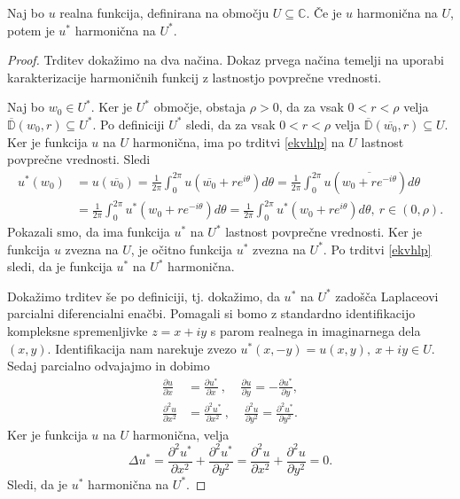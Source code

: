 \documentclass[mat1, tisk]{fmfdelo}
\begin{document}
    \begin{lema}
        \label{lemaharm}
        Naj bo $u$ realna funkcija, definirana na območju $U \subseteq \mathbb{C}$. Če je $u$ harmonična na $U$, potem je $u^*$ harmonična na $U^*$. 
    \end{lema}
    \begin{proof}
        Trditev dokažimo na dva načina. Dokaz prvega načina temelji na uporabi karakterizacije harmoničnih funkcij z lastnostjo povprečne vrednosti. 
        
        Naj bo \mbox{$w_0 \in U^*$}. Ker je $U^*$ območje, obstaja $\rho>0$, da za vsak $0 < r < \rho$ velja $\overline{\mathbb{D}}(w_0, r) \subseteq U^*$. Po definiciji $U^*$ sledi, da za vsak \mbox{$0 < r < \rho$} velja $\overline{\mathbb{D}}(\overline{w_0}, r) \subseteq U$. 
        Ker je funkcija $u$ na $U$ harmonična, ima po trditvi \ref{ekvhlp} na $U$ lastnost povprečne vrednosti. Sledi
        \begin{align*}
            u^*(w_0) & = u(\overline{w_0}) = \frac{1}{2 \pi} \int_{0}^{2 \pi}{u\left(\overline{w_0} + r e^{i \theta}\right) d\theta} = \frac{1}{2 \pi} \int_{0}^{2 \pi}{u\left(\overline{w_0 + r e^{-i \theta}}\right) d\theta}\\
            &= \frac{1}{2 \pi} \int_{0}^{2 \pi}{u^*\left(w_0 + r e^{-i \theta}\right) d\theta} = \frac{1}{2 \pi} \int_{0}^{2 \pi}{u^*\left(w_0 + r e^{i \theta}\right) d\theta},~r \in (0, \rho).
        \end{align*} 
        Pokazali smo, da ima funkcija $u^*$ na $U^*$ lastnost povprečne vrednosti. 
        Ker je funkcija $u$ zvezna na $U$, je očitno funkcija $u^*$ zvezna na $U^*$. 
        Po trditvi \ref{ekvhlp} sledi, da je funkcija $u^*$ na $U^*$ harmonična. 
        
        Dokažimo trditev še po definiciji, tj. dokažimo, da $u^*$ na $U^*$ zadošča Laplaceovi parcialni diferencialni enačbi.
        Pomagali si bomo z standardno identifikacijo kompleksne spremenljivke $z = x + iy$ s parom realnega in imaginarnega dela $(x,y)$.
        Identifikacija nam narekuje zvezo $u^*(x,-y) = u(x, y),~ x + iy \in U$.
        Sedaj parcialno odvajajmo in dobimo
        \begin{align*}
            \frac{\partial u}{\partial x} &= \frac{\partial u^* }{\partial x}~,~~~~~\frac{\partial u}{\partial y} = - \frac{\partial u^* }{\partial y}, \\
            \frac{\partial^2 u}{\partial x^2} & = \frac{\partial^2 u^* }{\partial x^2}~,~~~~~\frac{\partial^2 u}{\partial y^2} = \frac{\partial^2 u^* }{\partial y^2}.
        \end{align*}
        Ker je funkcija $u$ na $U$ harmonična, velja
        $$
            \Delta u^* = \frac{\partial^2 u^*}{\partial x^2} + \frac{\partial^2 u^*}{\partial y^2} = \frac{\partial^2 u}{\partial x^2} + \frac{\partial^2 u}{\partial y^2} = 0.
        $$
        Sledi, da je $u^*$ harmonična na $U^*$.
    \end{proof}
    
\end{document}

